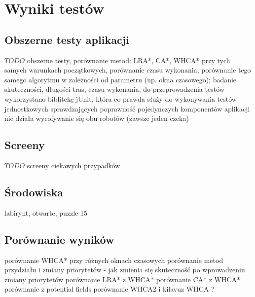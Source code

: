 \chapter{Wyniki testów}
\label{ch:tests}

\section{Obszerne testy aplikacji}
$TODO$ obszerne testy, porównanie metod: LRA*, CA*, WHCA* przy tych samych warunkach początkowych, porównanie czasu wykonania, porównanie tego samego algorytmu w zależności od parametru (np. okna czasowego); badanie skuteczności, długości tras, czasu wykonania, 
do przeprowadzenia testów wykorzystano biblitekę jUnit, która co prawda służy do wykonywania testów jednostkowych sprawdzających poprawność pojedynczych komponentów aplikacji
nie działa wycofywanie się obu robotów (zawsze jeden czeka)


\section{Screeny}
$TODO$ screeny ciekawych przypadków

\section{Środowiska}
labirynt, otwarte, puzzle 15

\section{Porównanie wyników}
porównanie WHCA* przy różnych oknach czasowych
porównanie metod przydziału i zmiany priorytetów - jak zmienia się skuteczność  po wprowadzeniu zmiany priorytetów
porównanie LRA* z WHCA*
porównanie CA* z WHCA*
porównanie z potential fields
porównanie WHCA2 i kilavuz WHCA ?